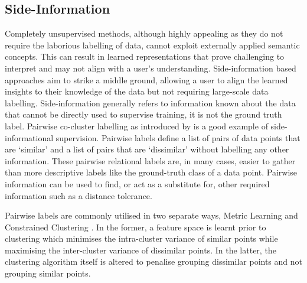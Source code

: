 \documentclass[../thesis.tex]{subfiles}
\begin{document}
\subsection{Side-Information}
Completely unsupervised methods, although highly appealing as they do not require the laborious labelling of data, cannot exploit externally applied semantic concepts.
This can result in learned representations that prove challenging to interpret and may not align with a user's understanding.
Side-information based approaches aim to strike a middle ground, allowing a user to align the learned insights to their knowledge of the data but not requiring large-scale data labelling.
Side-information generally refers to information known about the data that cannot be directly used to supervise training, \ie it is not the ground truth label.
Pairwise co-cluster labelling as introduced by \citet{xing2002distance} is a good example of side-informational supervision. 
Pairwise labels define a list of pairs of data points that are `similar' and a list of pairs that are `dissimilar'  without labelling any other information. These pairwise relational labels are, in many cases, easier to gather than more descriptive labels like the ground-truth class of a data point.
Pairwise information can be used to find, or act as a substitute for, other required information such as a distance tolerance. 

Pairwise labels are commonly utilised in two separate ways, Metric Learning \cite{bar2005learning, bilenko2004integrating, chang2004locally, xing2002distance} and Constrained Clustering \cite{shental2003computing, lu2004semi}. In the former, a feature space is learnt prior to clustering which minimises the intra-cluster variance of similar points while maximising the inter-cluster variance of dissimilar points. 
In the latter, the clustering algorithm itself is altered to penalise grouping dissimilar points and not grouping similar points.
\end{document}
